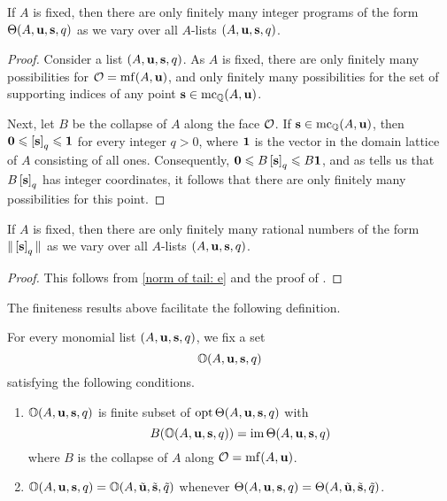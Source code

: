 \documentclass[11pt]{amsart}
\renewcommand{\!}[1]{{\color{red}\text{$\star$\,}#1\,$\star$}}
\begin{document}
\begin{lemma} 
\label{finitely many secondary programs: L} 
If $A$ is fixed, then there are only finitely many integer programs of the form $\Theta(A, \mathbf{u}, \mathbf{s}, q)$ as we vary over all $A$-lists $(A, \mathbf{u}, \mathbf{s}, q)$.
\end{lemma}

\begin{proof}  Consider a list $(A, \mathbf{u}, \mathbf{s}, q)$.  As $A$ is fixed, there are only finitely many possibilities for $\mathcal{O} = \operatorname{mf}(A, \mathbf{u})$, and only finitely many possibilities for the set of supporting indices of any point $\mathbf{s} \in \operatorname{mc}_{\mathbb{Q}}(A ,\mathbf{u})$.  

Next, let $B$ be the collapse of $A$ along the face $\mathcal{O}$.  If $\mathbf{s} \in \operatorname{mc}_{\mathbb{Q}}(A, \mathbf{u})$, then $\mathbf{0} \leqslant \left[ \mathbf{s} \right]_q \leqslant \mathbf{1}$ for every integer $q > 0$, where $\mathbf{1}$ is the vector in the domain lattice of $A$ consisting of all ones.  Consequently, $\mathbf{0} \leqslant B \left[ \mathbf{s} \right]_q \leqslant B \mathbf{1}$, and as  tells us that $B \left[ \mathbf{s} \right]_q$ has integer coordinates, it follows that there are only finitely many possibilities for this point.
 \end{proof}

\begin{corollary} 
\label{finitely many coord sums: C}
 If $A$ is fixed, then there are only finitely many rational numbers of the form $ \| \left[ \mathbf{s} \right]_q \|$ as we vary over all $A$-lists $(A, \mathbf{u}, \mathbf{s}, q)$.  
\end{corollary}

\begin{proof}  This follows from \eqref{norm of tail: e} and the proof of .
\end{proof}


The finiteness results above facilitate the following definition.



\newcommand{\orep}{\mathbb{O}}

\begin{definition}
\label{orep: D}

  For every monomial list $(A, \mathbf{u}, \mathbf{s}, q)$, we fix a set 
\[ \orep(A, \vv{u}, \vv{s}, q) \] satisfying the following conditions.
\begin{enumerate}
\item  $\orep(A, \vv{u}, \vv{s}, q)$ is finite subset of $\operatorname{opt} \Theta(A, \mathbf{u}, \mathbf{s}, q)$ with \[ B( \orep(A, \vv{u}, \vv{s}, q) ) = \im \ip(A, \vv{u}, \vv{s}, q) \]
where $B$ is the collapse of $A$ along $\mathcal{O} = \operatorname{mf}(A, \mathbf{u})$.
 
\item $\orep(A, \vv{u}, \vv{s}, q) = \orep(A, \tilde{\vv{u}}, \tilde{\vv{s}}, \tilde{q})$ whenever  
$\Theta(A, \mathbf{u}, \mathbf{s}, q) = \Theta(A, \tilde{\mathbf{u}}, \tilde{\mathbf{s}}, \tilde{q})$.
\end{enumerate} 
\end{definition}
\end{document}
